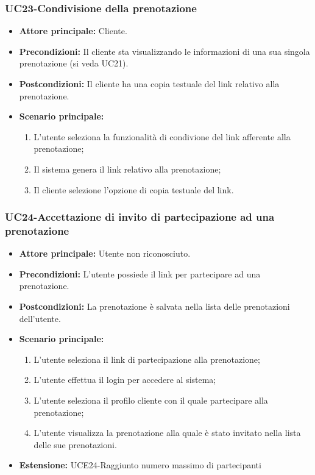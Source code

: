 \subsubsection{UC23-Condivisione della prenotazione}
\begin{itemize}
    \item \textbf{Attore principale: } Cliente.
    \item \textbf{Precondizioni: }Il cliente sta visualizzando le informazioni di una sua singola prenotazione (si veda UC21).
    \item \textbf{Postcondizioni: }Il cliente ha una copia testuale del link relativo alla prenotazione.
    \item \textbf{Scenario principale:}
        \begin{enumerate}
            \item L'utente seleziona la funzionalità di condivione del link afferente alla prenotazione;
            \item Il sistema genera il link relativo alla prenotazione;
            \item Il cliente selezione l'opzione di copia testuale del link.
        \end{enumerate}
\end{itemize}

\subsubsection{UC24-Accettazione di invito di partecipazione ad una prenotazione}
\begin{itemize}
    \item \textbf{Attore principale: } Utente non riconosciuto.
    \item \textbf{Precondizioni: }L'utente possiede il link per partecipare ad una prenotazione.
    \item \textbf{Postcondizioni: }La prenotazione è salvata nella lista delle prenotazioni dell'utente.
    \item \textbf{Scenario principale:}
        \begin{enumerate}
            \item L'utente seleziona il link di partecipazione alla prenotazione;
            \item L'utente effettua il login per accedere al sistema;
            \item L'utente seleziona il profilo cliente con il quale partecipare alla prenotazione;
            \item L'utente visualizza la prenotazione alla quale è stato invitato nella lista delle sue
            prenotazioni.
        \end{enumerate}
        \item \textbf{Estensione: }UCE24-Raggiunto numero massimo di partecipanti
    \end{itemize}


